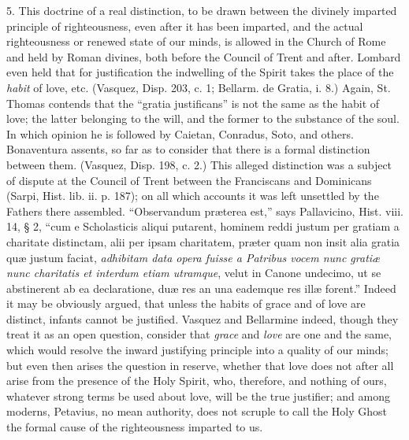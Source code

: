 5. This doctrine of a real distinction, to be drawn between the
divinely imparted principle of righteousness, even after it has been
imparted, and the actual righteousness or renewed state of our minds,
is allowed in the Church of Rome and held by Roman divines, both
before the Council of Trent and after. Lombard even held that for
justification the indwelling of the Spirit takes the place of the \emph{habit}
of love, etc. (Vasquez, Disp. 203, c. 1; Bellarm. de Gratia, i. 8.)
Again, St. Thomas contends that the ``gratia justificans'' is
not the same as the habit of love; the latter belonging to the will,
and the former to the substance of the soul. In which opinion he is
followed by Caietan, Conradus, Soto, and others. Bonaventura assents,
so far as to consider that there is a formal distinction between them.
(Vasquez, Disp. 198, c. 2.) This alleged distinction was a subject of
dispute at the Council of Trent between the Franciscans and Dominicans
(Sarpi, Hist. lib. ii. p. 187); on all which accounts it was left
unsettled by the Fathers there assembled. ``Observandum præterea
est,'' says Pallavicino, Hist. viii. 14, § 2, ``cum e
Scholasticis aliqui putarent, hominem reddi justum per gratiam a
charitate distinctam, alii per ipsam charitatem, præter quam non
insit alia gratia quæ justum faciat, \emph{adhibitam data opera fuisse a
Patribus vocem nunc gratiæ nunc charitatis et interdum etiam utramque},
velut in Canone undecimo, ut se abstinerent ab ea declaratione, duæ
res an una eademque res illæ forent.'' Indeed it may be obviously argued, that unless the habits of grace and of love are
distinct, infants cannot be justified. Vasquez and Bellarmine indeed,
though they treat it as an open question, consider that \emph{grace} and
\emph{love}
are one and the same, which would resolve the inward justifying
principle into a quality of our minds; but even then arises the
question in reserve, whether that love does not after all arise from
the presence of the Holy Spirit, who, therefore, and nothing of ours,
whatever strong terms be used about love, will be the true justifier;
and among moderns, Petavius, no mean authority, does not scruple to
call the Holy Ghost the formal cause of the righteousness imparted to
us.

